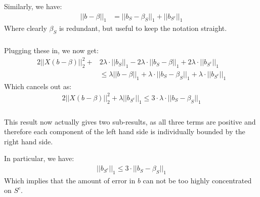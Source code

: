 \begin{frame}[fragile] \frametitle{}

Similarly, we have:
\begin{align*}
|| b - \beta ||_1 &= || b_S - \beta_S ||_1 + || b_{S^c} ||_1
\end{align*}
Where clearly $\beta_S$ is redundant, but useful to keep the
notation straight.

\end{frame}

\begin{frame}[fragile] \frametitle{}

Plugging these in, we now get:
\begin{align*}
2 || X (b - \beta) ||_2^2 + &2 \lambda \cdot || b_S ||_1 - 2 \lambda \cdot || b_S - \beta ||_1
  + 2 \lambda \cdot || b_{S^c} ||_1 \\
&\leq \lambda || b - \beta ||_1 + \lambda \cdot || b_S - \beta_S ||_1 + \lambda \cdot || b_{S^c} ||_1
\end{align*}
\pause Which cancels out as:
\begin{align*}
2 || X (b - \beta) ||_2^2 + \lambda || b_{S^c} ||_1 \leq 3 \cdot \lambda \cdot || b_S - \beta_S ||_1
\end{align*}

\end{frame}

\begin{frame}[fragile] \frametitle{}

This result now actually gives two sub-results, as all three terms are positive and
therefore each component of the left hand side is individually bounded by the right
hand side.

\pause In particular, we have:
\begin{align*}
|| b_{S^c} ||_1 \leq 3 \cdot || b_S - \beta_S ||_1
\end{align*}
Which implies that the amount of error in $b$ can not be too highly concentrated
on $S^c$.

\end{frame}

